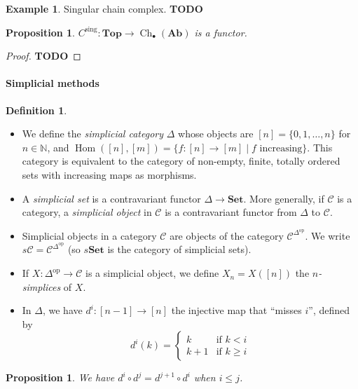 \documentclass{article}
\newcommand{\op}{\mathrm{op}}
\newcommand{\N}{\mathbb{N}}
\newcommand{\cat}{\mathcal{C}}
\newcommand{\Set}{\mathbf{Set}}
\newcommand{\Top}{\mathbf{Top}}
\newcommand{\Ab}{\mathbf{Ab}}
\DeclareMathOperator{\Ch}{Ch}
\DeclareMathOperator{\Hom}{Hom}
\newcommand{\todo}{\textbf{TODO}}
\theoremstyle{plain}
\newtheorem{proposition}[theorem]{Proposition}
\theoremstyle{definition}
\newtheorem{definition}[theorem]{Definition}
\newtheorem{example}[theorem]{Example}
\theoremstyle{remark}
\begin{document}
\begin{example}
    Singular chain complex. \todo
\end{example}

\begin{proposition}
    $C^\text{sing} : \Top \to \Ch_\bullet (\Ab)$ is a functor.
\end{proposition}

\begin{proof}
    \todo
\end{proof}

\paragraph{Simplicial methods}

\begin{definition} \leavevmode
    \begin{itemize}
        \item We define the \emph{simplicial category} $\Delta$ whose objects are $[n] = \{0,1,\dots,n\}$ for $n \in \N$, and $\Hom([n],[m]) = \{f : [n] \to [m] \mid f \text{ increasing}\}$. This category is equivalent to the category of non-empty, finite, totally ordered sets with increasing maps as morphisms.
        \item A \emph{simplicial set} is a contravariant functor $\Delta \to \Set$. More generally, if $\cat$ is a category, a \emph{simplicial object} in $\cat$ is a contravariant functor from $\Delta$ to $\cat$.
        \item Simplicial objects in a category $\cat$ are objects of the category $\cat^{\Delta^\op}$. We write $s\cat = \cat^{\Delta^\op}$ (so $s\Set$ is the category of simplicial sets).
        \item If $X : \Delta^\op \to \cat$ is a simplicial object, we define $X_n = X([n])$ the \emph{$n$-simplices} of $X$.
        \item In $\Delta$, we have $d^i : [n-1] \to [n]$ the injective map that ``misses $i$'', defined by
        \[d^i(k) = \begin{cases}
            k & \text{if } k < i \\
            k+1 & \text{if } k \ge i
        \end{cases}\]
    \end{itemize}
\end{definition}

\begin{proposition}
    We have $d^i \circ d^j = d^{j+1} \circ d^i$ when $i\le j$.
\end{proposition}
\end{document}
